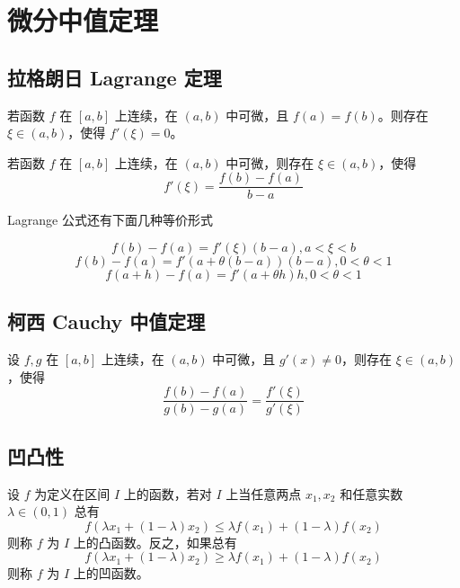 \chapter{微分中值定理}

\section{拉格朗日 Lagrange 定理}

\begin{theorem}
    若函数 $f$ 在 $[a,b]$ 上连续，在 $(a,b)$ 中可微，且 $f(a)=f(b)$。则存在 $\xi\in(a,b)$，使得 $f'(\xi)=0$。
\end{theorem}

\begin{theorem}
    若函数 $f$ 在 $[a,b]$ 上连续，在 $(a,b)$ 中可微，则存在 $\xi\in(a,b)$，使得
    $$f'(\xi)=\frac{f(b)-f(a)}{b-a}$$
\end{theorem}

Lagrange 公式还有下面几种等价形式

$$f(b)-f(a) = f'(\xi)(b-a),a<\xi<b$$
$$f(b)-f(a) = f'(a+\theta(b-a))(b-a),0<\theta<1$$
$$f(a+h) - f(a) = f'(a+\theta h)h,0<\theta<1$$

\section{柯西 Cauchy 中值定理}

\begin{theorem}
    设 $f,g$ 在 $[a,b]$ 上连续，在 $(a,b)$ 中可微，且 $g'(x)\ne 0$，则存在 $\xi\in (a,b)$，使得
    $$\frac{f(b)-f(a)}{g(b)-g(a)} = \frac{f'(\xi)}{g'(\xi)}$$
\end{theorem}

\section{凹凸性}

\begin{definition}
    设 $f$ 为定义在区间 $I$ 上的函数，若对 $I$ 上当任意两点 $x_1,x_2$ 和任意实数 $\lambda\in (0,1)$ 总有
    $$f(\lambda x_1+(1-\lambda)x_2) \leqslant \lambda f(x_1)+(1-\lambda)f(x_2)$$
    则称 $f$ 为 $I$ 上的凸函数。反之，如果总有
    $$f(\lambda x_1+(1-\lambda)x_2) \geqslant \lambda f(x_1)+(1-\lambda)f(x_2)$$
    则称 $f$ 为 $I$ 上的凹函数。
\end{definition}

